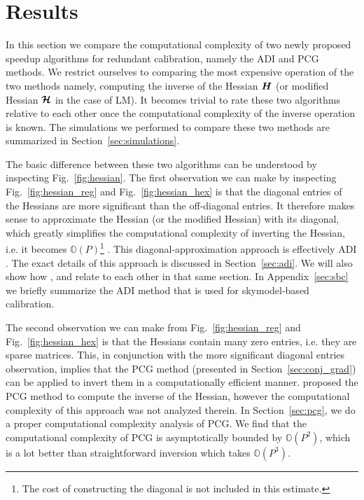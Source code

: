 \documentclass[useAMS,usenatbib]{mn2e}
\newcommand{\bH}{\bmath{H}}
\newcommand{\bmH}{\bmath{\mathcal{H}}}
\begin{document}
\section{Results}
\label{sec:results}
In this section we compare the computational complexity of two newly proposed speedup algorithms for redundant calibration, namely the ADI \citep{Marthi2014} and PCG \citep{Liu2010} methods. We restrict ourselves to comparing the most 
expensive operation of the two methods namely, computing the inverse of the Hessian $\bH$ (or modified Hessian $\bmH$ in the case of LM). It becomes trivial to rate these two 
algorithms relative to each other once the computational complexity of the inverse operation is known. The simulations we performed to compare these two 
methods are summarized in Section~\ref{sec:simulations}.

The basic difference between these two algorithms can be understood by inspecting Fig.~\ref{fig:hessian}. The first observation we can make by inspecting 
Fig.~\ref{fig:hessian_reg} and Fig.~\ref{fig:hessian_hex} is that the diagonal entries of the Hessians are more significant than the off-diagonal entries.
It therefore makes sense to approximate the Hessian (or the modified Hessian) with its diagonal, which greatly simplifies the computational complexity of inverting 
the Hessian, i.e. it becomes $\mathbb{O}(P)$\footnote{The cost of constructing 
the diagonal is not included in this estimate.} \citep{Smirnov2015}. This diagonal-approximation approach is effectively ADI \citep{Marthi2014}. The exact details of this 
approach is discussed in Section~\ref{sec:adi}. We will also show how \citet{Marthi2014}, \citet{Smirnov2015} and \citet{Salvini2014} relate to each other in that same section. In Appendix~\ref{sec:sbc} we briefly summarize the ADI method that is used for skymodel-based calibration.

The second observation we can make from Fig.~\ref{fig:hessian_reg} and Fig.~\ref{fig:hessian_hex} is that the Hessians contain many zero entries, i.e. they are sparse matrices. This, in conjunction with the more significant diagonal entries observation, implies that the PCG method (presented in Section~\ref{sec:conj_grad}) 
can be applied to invert them in a computationally efficient manner. \citet{Liu2010} proposed the PCG method to compute the inverse of the Hessian, however the computational complexity of this approach was not analyzed therein.  
In Section~\ref{sec:pcg}, we do a proper computational complexity analysis of PCG. We find that the computational complexity of PCG is asymptotically bounded by $\mathbb{O}(P^2)$, which is 
a lot better than straightforward inversion which takes $\mathbb{O}(P^3)$. 
\end{document}
